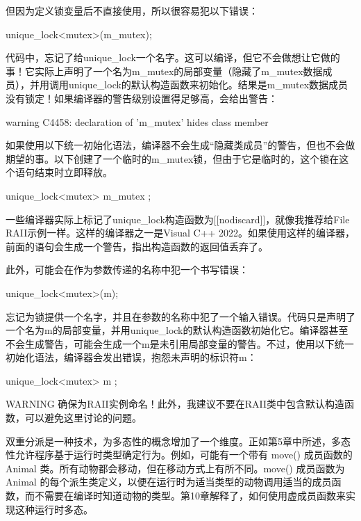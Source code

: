但因为定义锁变量后不直接使用，所以很容易犯以下错误：

\begin{cpp}
unique_lock<mutex>(m_mutex);
\end{cpp}

代码中，忘记了给unique\_lock一个名字。这可以编译，但它不会做想让它做的事！它实际上声明了一个名为m\_mutex的局部变量（隐藏了m\_mutex数据成员），并用调用unique\_lock的默认构造函数来初始化。结果是m\_mutex数据成员没有锁定！如果编译器的警告级别设置得足够高，会给出警告：

\begin{shell}
warning C4458: declaration of 'm_mutex' hides class member
\end{shell}

如果使用以下统一初始化语法，编译器不会生成“隐藏类成员”的警告，但也不会做期望的事。以下创建了一个临时的m\_mutex锁，但由于它是临时的，这个锁在这个语句结束时立即释放。

\begin{cpp}
unique_lock<mutex> { m_mutex };
\end{cpp}

一些编译器实际上标记了unique\_lock构造函数为[[nodiscard]]，就像我推荐给File RAII示例一样。这样的编译器之一是Visual C++ 2022。如果使用这样的编译器，前面的语句会生成一个警告，指出构造函数的返回值丢弃了。

此外，可能会在作为参数传递的名称中犯一个书写错误：

\begin{cpp}
unique_lock<mutex>(m);
\end{cpp}

忘记为锁提供一个名字，并且在参数的名称中犯了一个输入错误。代码只是声明了一个名为m的局部变量，并用unique\_lock的默认构造函数初始化它。编译器甚至不会生成警告，可能会生成一个m是未引用局部变量的警告。不过，使用以下统一初始化语法，编译器会发出错误，抱怨未声明的标识符m：

\begin{cpp}
unique_lock<mutex> { m };
\end{cpp}

\begin{myWarning}{WARNING}
确保为RAII实例命名！此外，我建议不要在RAII类中包含默认构造函数，可以避免这里讨论的问题。
\end{myWarning}


双重分派是一种技术，为多态性的概念增加了一个维度。正如第5章中所述，多态性允许程序基于运行时类型确定行为。例如，可能有一个带有 move() 成员函数的 Animal 类。所有动物都会移动，但在移动方式上有所不同。move() 成员函数为 Animal 的每个派生类定义，以便在运行时为适当类型的动物调用适当的成员函数，而不需要在编译时知道动物的类型。第10章解释了，如何使用虚成员函数来实现这种运行时多态。

